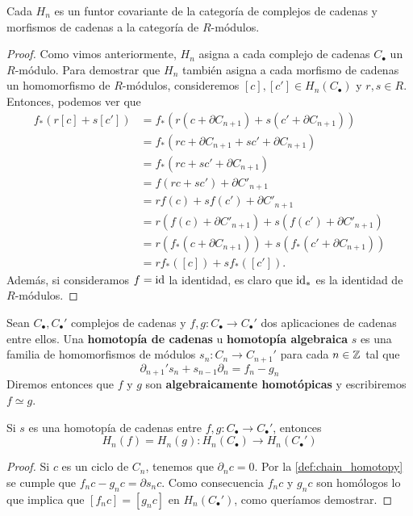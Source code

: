 \begin{proposicion}
	Cada \(H_{n}\) es un funtor covariante de la categoría de complejos de cadenas y
	morfismos de cadenas a la categoría de \(R\)-módulos.
\end{proposicion}
\begin{proof}
	Como vimos anteriormente, \(H_{n}\) asigna a cada complejo de cadenas
	\(C_{\bullet}\) un \(R\)-módulo. Para demostrar que \(H_{n}\) también asigna a cada morfismo
	de cadenas un homomorfismo de \(R\)-módulos, consideremos
	\([c], [c'] \in H_{n}(C_{\bullet})\) y \(r, s \in R\). Entonces, podemos ver que
	\begin{align}
		f_{*}(r[c] + s[c']) & = f_{*}(r(c + \partial C_{n+1}) + s(c' + \partial C_{n+1}))        \\
		& = f_{*}(rc + \partial C_{n+1}+ sc' + \partial C_{n+1})             \\
		& = f_{*}(rc + sc' + \partial C_{n+1})                               \\
		& = f(rc + sc') + \partial C'_{n+1}                                  \\
		& = rf(c) + sf(c') + \partial C'_{n+1}                               \\
		& = r(f(c) + \partial C'_{n+1}) + s(f(c') + \partial C'_{n+1})       \\
		& = r(f_{*}(c + \partial C_{n+1})) + s(f_{*}(c' + \partial C_{n+1})) \\
		& = rf_{*}([c]) + sf_{*}([c']).
	\end{align}
	Además, si consideramos \(f = \operatorname{id}\) la identidad, es claro que \(\operatorname{id}_{*}\) es la
	identidad de \(R\)-módulos.
\end{proof}

\begin{definicion}
	\label{def:chain_homotopy} Sean \(C_{\bullet},C_{\bullet}'\) complejos de cadenas
	y \(f,g: C_{\bullet}\rightarrow C_{\bullet}'\) dos aplicaciones de cadenas entre
	ellos. Una \textbf{homotopía de cadenas} u \textbf{homotopía algebraica} \(s\)
	es una familia de homomorfismos de módulos \(s_{n}: C_{n}\rightarrow C_{n+1}'\)
	para cada \(n \in \mathbb{Z}\) tal que
	\begin{equation}
		\partial_{n+1}'s_{n}+ s_{n-1}\partial_{n}= f_{n}- g_{n}
	\end{equation}
	Diremos entonces que \(f\) y \(g\) son \textbf{algebraicamente homotópicas} y escribiremos
	\(f \simeq g\).
\end{definicion}

\begin{teorema}
	\label{teo:homot-cad-misma-homologia} Si \(s\) es una homotopía de cadenas entre
	\(f,g: C_{\bullet}\rightarrow C_{\bullet}'\), entonces
	\[
	H_{n}(f) = H_{n}(g) : H_{n}(C_{\bullet}) \rightarrow H_{n}(C_{\bullet}')
	\]
\end{teorema}
\begin{proof}
	Si \(c\) es un ciclo de \(C_{n}\), tenemos que \(\partial_{n}c = 0\). Por la \autoref{def:chain_homotopy}
	se cumple que \(f_{n}c-g_{n}c = \partial s_{n}c\). Como consecuencia \(f_{n}c\) y
	\(g_{n}c\) son homólogos lo que implica que \([f_{n}c] = [g_{n}c]\) en
	\(H_{n}(C_{\bullet}')\), como queríamos demostrar.
\end{proof}

